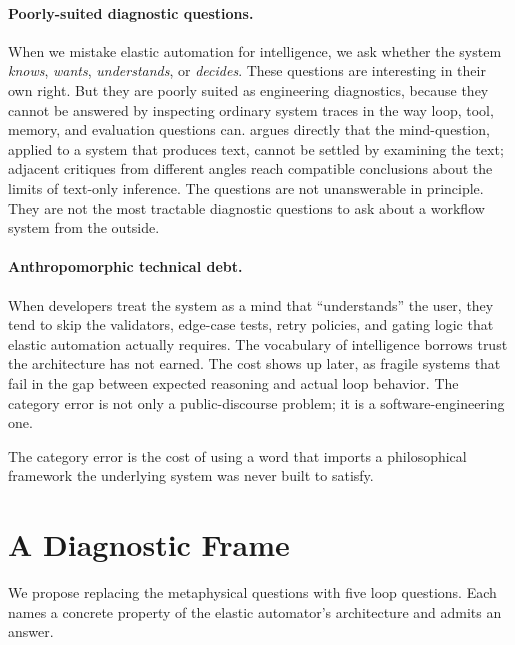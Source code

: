 \documentclass[11pt,a4paper]{article}
\begin{document}
\paragraph{Poorly-suited diagnostic questions.} When we mistake elastic automation for intelligence, we ask whether the system \textit{knows}, \textit{wants}, \textit{understands}, or \textit{decides}. These questions are interesting in their own right. But they are poorly suited as engineering diagnostics, because they cannot be answered by inspecting ordinary system traces in the way loop, tool, memory, and evaluation questions can. \citet{searle1980minds} argues directly that the mind-question, applied to a system that produces text, cannot be settled by examining the text; adjacent critiques from different angles \citep{dreyfus1972computers,bender2021parrots} reach compatible conclusions about the limits of text-only inference. The questions are not unanswerable in principle. They are not the most tractable diagnostic questions to ask about a workflow system from the outside.

\paragraph{Anthropomorphic technical debt.} When developers treat the system as a mind that ``understands'' the user, they tend to skip the validators, edge-case tests, retry policies, and gating logic that elastic automation actually requires. The vocabulary of intelligence borrows trust the architecture has not earned. The cost shows up later, as fragile systems that fail in the gap between expected reasoning and actual loop behavior. The category error is not only a public-discourse problem; it is a software-engineering one.

The category error is the cost of using a word that imports a philosophical framework the underlying system was never built to satisfy.

\section{A Diagnostic Frame}\label{sec:diagnostic-frame}

We propose replacing the metaphysical questions with five loop questions. Each names a concrete property of the elastic automator's architecture and admits an answer.
\end{document}
